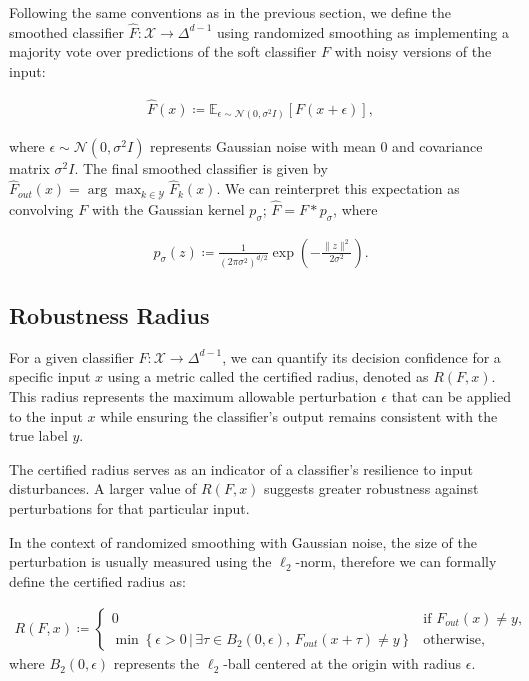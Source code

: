 Following the same conventions as in the previous section, we define the smoothed classifier $\hat{F}: \mathcal{X} \rightarrow \Delta^{d-1}$ using randomized smoothing as implementing a majority vote over predictions of the soft classifier $F$ with noisy versions of the input:

\begin{align*}
    \hat{F}(x) \coloneqq \mathbb{E}_{\epsilon \sim \mathcal{N}(0, \sigma^2 I)} [F(x + \epsilon)],
\end{align*}

where $\epsilon \sim \mathcal{N}(0, \sigma^2 I)$ represents Gaussian noise with mean $0$ and covariance matrix $\sigma^2 I$.
The final smoothed classifier is given by $\hat{F}_{out}(x) = \arg\max_{k \in \mathcal{Y}} \hat{F}_k(x)$.
We can reinterpret this expectation as convolving $F$ with the Gaussian kernel $p_\sigma$; $\hat{F} = F * p_\sigma$, where

\begin{align*}
    p_\sigma(z) \coloneqq \frac{1}{(2\pi\sigma^2)^{d/2}} \exp\left(-\frac{\|z\|^2}{2\sigma^2}\right).
\end{align*}

\subsection{Robustness Radius}\label{subsec:robustness-radius}

For a given classifier $F: \mathcal{X} \rightarrow \Delta^{d-1}$, we can quantify its decision confidence for a specific input $x$ using a metric called the certified radius, denoted as $R(F,x)$.
This radius represents the maximum allowable perturbation $\epsilon$ that can be applied to the input $x$ while ensuring the classifier's output remains consistent with the true label $y$.

The certified radius serves as an indicator of a classifier's resilience to input disturbances.
A larger value of $R(F,x)$ suggests greater robustness against perturbations for that particular input.

In the context of randomized smoothing with Gaussian noise, the size of the perturbation is usually measured using the $\ell_2$-norm, therefore we can formally define the certified radius as:

\begin{align*}
    R(F,x) \coloneqq
    \begin{cases}
        0 & \text{if } F_{out}(x) \neq y, \\[2ex]
        \min \left\{ \epsilon > 0 \,|\, \exists \tau \in B_2(0,\epsilon),\, F_{out}(x + \tau) \neq y \right\} & \text{otherwise,}
    \end{cases}
\end{align*}
where $B_2(0,\epsilon)$ represents the $\ell_2$-ball centered at the origin with radius $\epsilon$.